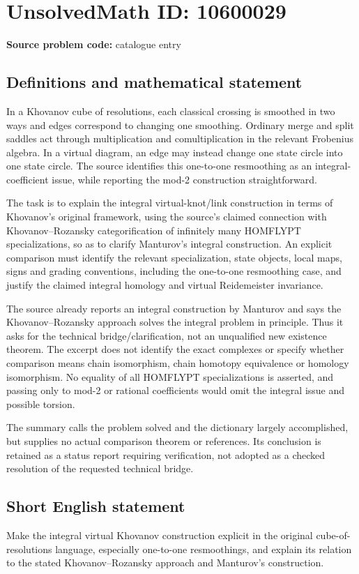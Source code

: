 \documentclass[11pt]{article}
\begin{document}
\section*{UnsolvedMath ID: 10600029}
\textbf{Source problem code:} catalogue entry
\subsection{Definitions and mathematical statement}
In a Khovanov cube of resolutions, each classical crossing is smoothed in two ways and edges correspond to changing one smoothing. Ordinary merge and split saddles act through multiplication and comultiplication in the relevant Frobenius algebra. In a virtual diagram, an edge may instead change one state circle into one state circle. The source identifies this one-to-one resmoothing as an integral-coefficient issue, while reporting the mod-2 construction straightforward.

The task is to explain the integral virtual-knot/link construction in terms of Khovanov's original framework, using the source's claimed connection with Khovanov--Rozansky categorification of infinitely many HOMFLYPT specializations, so as to clarify Manturov's integral construction. An explicit comparison must identify the relevant specialization, state objects, local maps, signs and grading conventions, including the one-to-one resmoothing case, and justify the claimed integral homology and virtual Reidemeister invariance.

The source already reports an integral construction by Manturov and says the Khovanov--Rozansky approach solves the integral problem in principle. Thus it asks for the technical bridge/clarification, not an unqualified new existence theorem. The excerpt does not identify the exact complexes or specify whether comparison means chain isomorphism, chain homotopy equivalence or homology isomorphism. No equality of all HOMFLYPT specializations is asserted, and passing only to mod-2 or rational coefficients would omit the integral issue and possible torsion.

The summary calls the problem solved and the dictionary largely accomplished, but supplies no actual comparison theorem or references. Its conclusion is retained as a status report requiring verification, not adopted as a checked resolution of the requested technical bridge.
\subsection{Short English statement}
Make the integral virtual Khovanov construction explicit in the original cube-of-resolutions language, especially one-to-one resmoothings, and explain its relation to the stated Khovanov--Rozansky approach and Manturov's construction.
\end{document}
